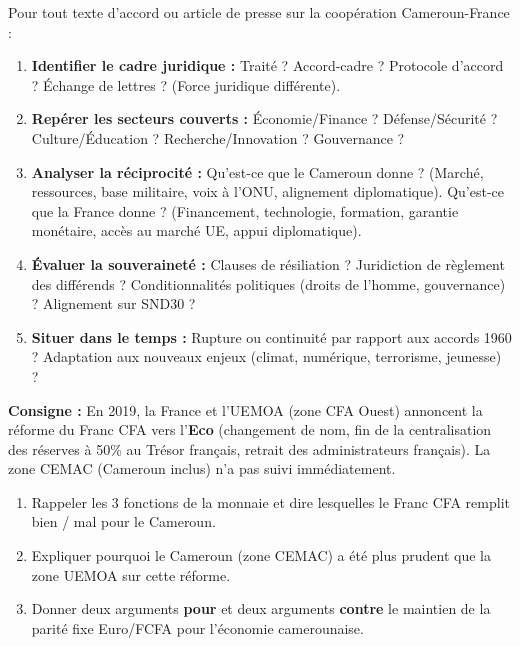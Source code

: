 \documentclass[11pt]{article}
\begin{document}
\begin{methode}
Pour tout texte d'accord ou article de presse sur la coopération Cameroun-France :
\begin{enumerate}
    \item \textbf{Identifier le cadre juridique :} Traité ? Accord-cadre ? Protocole d'accord ? Échange de lettres ? (Force juridique différente).
    \item \textbf{Repérer les secteurs couverts :} Économie/Finance ? Défense/Sécurité ? Culture/Éducation ? Recherche/Innovation ? Gouvernance ?
    \item \textbf{Analyser la réciprocité :} Qu'est-ce que le Cameroun donne ? (Marché, ressources, base militaire, voix à l'ONU, alignement diplomatique). Qu'est-ce que la France donne ? (Financement, technologie, formation, garantie monétaire, accès au marché UE, appui diplomatique).
    \item \textbf{Évaluer la souveraineté :} Clauses de résiliation ? Juridiction de règlement des différends ? Conditionnalités politiques (droits de l'homme, gouvernance) ? Alignement sur SND30 ?
    \item \textbf{Situer dans le temps :} Rupture ou continuité par rapport aux accords 1960 ? Adaptation aux nouveaux enjeux (climat, numérique, terrorisme, jeunesse) ?
\end{enumerate}
\end{methode}

\begin{exercice}
\textbf{Consigne :} En 2019, la France et l'UEMOA (zone CFA Ouest) annoncent la réforme du Franc CFA vers l'\textbf{Eco} (changement de nom, fin de la centralisation des réserves à 50\% au Trésor français, retrait des administrateurs français). La zone CEMAC (Cameroun inclus) n'a pas suivi immédiatement.
\begin{enumerate}
    \item Rappeler les 3 fonctions de la monnaie et dire lesquelles le Franc CFA remplit bien / mal pour le Cameroun.
    \item Expliquer pourquoi le Cameroun (zone CEMAC) a été plus prudent que la zone UEMOA sur cette réforme.
    \item Donner deux arguments \textbf{pour} et deux arguments \textbf{contre} le maintien de la parité fixe Euro/FCFA pour l'économie camerounaise.
\end{enumerate}
\end{exercice}
\end{document}
